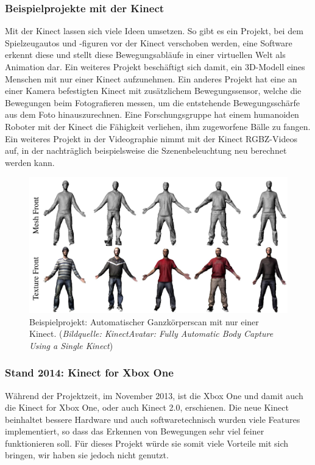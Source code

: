 \documentclass[12pt,a4paper,ngerman]{scrartcl}
\begin{document}
\subsubsection{Beispielprojekte mit der Kinect}

Mit der Kinect lassen sich viele Ideen umsetzen. So gibt es ein Projekt, bei dem Spielzeugautos und
-figuren vor der Kinect verschoben werden, eine Software erkennt diese und stellt diese Bewegungsabläufe
in einer virtuellen Welt als Animation dar.\cite{3dpuppetry} Ein weiteres Projekt beschäftigt sich
damit, ein 3D-Modell eines Menschen mit nur einer Kinect aufzunehmen.\cite{kinectavatar} Ein anderes Projekt hat eine an einer Kamera
befestigten Kinect mit zusätzlichem Bewegungssensor, welche die Bewegungen beim Fotografieren messen, um die
entstehende Bewegungsschärfe aus dem Foto hinauszurechnen.\cite{motiondeblurring} Eine Forschungsgruppe
hat einem humanoiden Roboter mit der Kinect die Fähigkeit verliehen, ihm zugeworfene Bälle zu fangen.\cite{kober}
Ein weiteres Projekt in der Videographie nimmt mit der Kinect RGBZ-Videos auf, in der nachträglich beispielsweise die
Szenenbeleuchtung neu berechnet werden kann.\cite{rgbzvideos}

\begin{figure}[H]
    \centering
    \includegraphics[scale=0.3]{img/kinectavatar.jpg}
    \caption{Beispielprojekt: Automatischer Ganzkörperscan mit nur einer Kinect. ({\em Bildquelle: KinectAvatar: Fully Automatic Body Capture Using a Single Kinect\cite{kinectavatar}})}
\end{figure}

\subsubsection{Stand 2014: Kinect for Xbox One}
Während der Projektzeit, im November 2013, ist die Xbox One und damit auch die Kinect for Xbox One, oder auch Kinect 2.0, erschienen.\cite{kinect2:verge} Die neue Kinect beinhaltet bessere Hardware und auch softwaretechnisch wurden viele Features implementiert, so dass das Erkennen von Bewegungen sehr viel feiner funktionieren soll. Für dieses Projekt würde sie somit viele Vorteile mit sich bringen, wir haben sie jedoch nicht genutzt.
\end{document}
